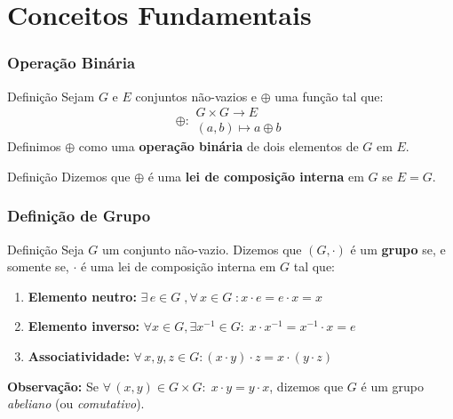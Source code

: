 \documentclass{beamer}
\begin{document}
\section{Conceitos Fundamentais}

\begin{frame}
\frametitle{Operação Binária}

\begin{block}{Definição}
Sejam $G$ e $E$ conjuntos não-vazios e $\oplus$ uma função tal que:
\[
\oplus: 
\begin{array}{c}
G\times G \to E \\
(a, b) \mapsto a \oplus b
\end{array}
\]
Definimos $\oplus$ como uma \textbf{operação binária} de dois elementos de $G$ em $E$.
\end{block}

\pause

\begin{block}{Definição}
Dizemos que $\oplus$ é uma \textbf{lei de composição interna} em $G$ se $E = G$.
\end{block}

\end{frame}

\begin{frame}
\frametitle{Definição de Grupo}

\begin{block}{Definição}
Seja $G$ um conjunto não-vazio. Dizemos que $(G, \cdot)$ é um \textbf{grupo} se, e somente se, $\cdot$ é uma lei de composição interna em $G$ tal que:

\begin{enumerate}
\item \textbf{Elemento neutro:} $\exists \,e \in G \; , \forall \,x \in G \; : x\cdot e = e\cdot x = x$
\item \textbf{Elemento inverso:} $\forall x \in G, \exists x^{-1}\in G: \; x\cdot x^{-1} = x^{-1} \cdot x = e$
\item \textbf{Associatividade:} $\forall \, x,y,z \in G : (x\cdot y)\cdot z = x\cdot (y\cdot z)$
\end{enumerate}
\end{block}

\pause

\textbf{Observação:} Se $\forall \,(x,y) \in G \times G:\; x \cdot y = y \cdot x$, dizemos que $G$ é um grupo \emph{abeliano} (ou \emph{comutativo}).

\end{frame}
\end{document}
